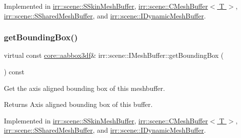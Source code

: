 Implemented in \hyperlink{structirr_1_1scene_1_1SSkinMeshBuffer_a5395bc06c4c6b1c9a82dbdd56916a9e0}{irr\+::scene\+::\+S\+Skin\+Mesh\+Buffer}, \hyperlink{classirr_1_1scene_1_1CMeshBuffer_af48b88e6c1bd79e6abd6a6803aa106c0}{irr\+::scene\+::\+C\+Mesh\+Buffer$<$ T $>$}, \hyperlink{structirr_1_1scene_1_1SSharedMeshBuffer_aa4fbcc497cfd0b431bb85d607ed6a2fb}{irr\+::scene\+::\+S\+Shared\+Mesh\+Buffer}, and \hyperlink{classirr_1_1scene_1_1IDynamicMeshBuffer_aada30374517d2a52d6264b6359a1e35c}{irr\+::scene\+::\+I\+Dynamic\+Mesh\+Buffer}.

\mbox{\label{classirr_1_1scene_1_1IMeshBuffer_ac53fe1096756a40f25dae25911e27c51}} 
\subsubsection{\texorpdfstring{get\+Bounding\+Box()}{getBoundingBox()}}
{\footnotesize\ttfamily virtual const \hyperlink{namespaceirr_1_1core_adfc8fa01b30044c55f3332a1d6c1aa19}{core\+::aabbox3df}\& irr\+::scene\+::\+I\+Mesh\+Buffer\+::get\+Bounding\+Box (\begin{DoxyParamCaption}{ }\end{DoxyParamCaption}) const\hspace{0.3cm}{\ttfamily [pure virtual]}}



Get the axis aligned bounding box of this meshbuffer. 

\begin{DoxyReturn}{Returns}
Axis aligned bounding box of this buffer. 
\end{DoxyReturn}


Implemented in \hyperlink{structirr_1_1scene_1_1SSkinMeshBuffer_a350535b406a7607bd392d07e5c3f9401}{irr\+::scene\+::\+S\+Skin\+Mesh\+Buffer}, \hyperlink{classirr_1_1scene_1_1CMeshBuffer_a759863b44c024f79747019f492a5c7cf}{irr\+::scene\+::\+C\+Mesh\+Buffer$<$ T $>$}, \hyperlink{structirr_1_1scene_1_1SSharedMeshBuffer_a5a736dee60a5f5ebc929dc03c0763082}{irr\+::scene\+::\+S\+Shared\+Mesh\+Buffer}, and \hyperlink{classirr_1_1scene_1_1IDynamicMeshBuffer_a9053baee5a13c8b51e306d99e5ef7427}{irr\+::scene\+::\+I\+Dynamic\+Mesh\+Buffer}.

\mbox{\label{classirr_1_1scene_1_1IMeshBuffer_acc389d76856dfb06c3ba45a92315e6d8}} 
